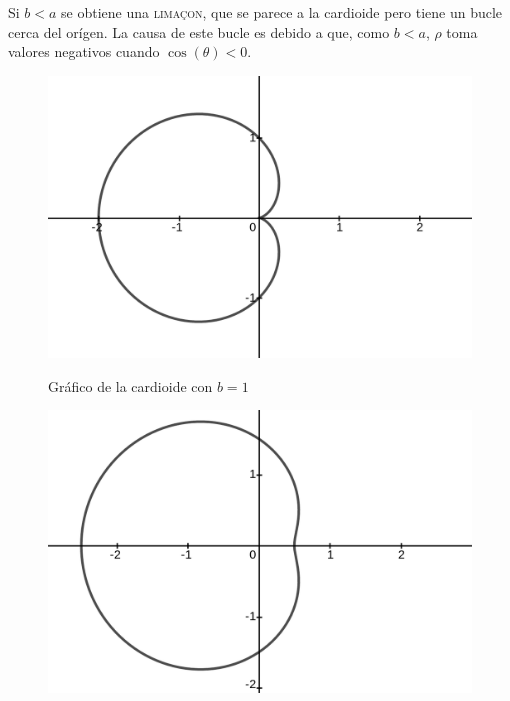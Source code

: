 \documentclass[mid,fleqn,draft,twoside]{notasdeclase}
\begin{document}
\begin{ejem}[cardioides]
	Si $b<a$ se obtiene una \textsc{lima\c con}, que se parece a la cardioide pero tiene un bucle cerca del orígen. La causa de este bucle es debido a que, como $b<a$, $\rho$ toma valores negativos cuando $\cos(\theta)<0$.\\
\begin{minipage}{.32\linewidth}
	\begin{figure}[H]\centering
		\includegraphics[width=1\linewidth]{pics/c1}\\ 
		\caption{Gráfico de la cardioide con $b=1$}\label{ch0g3}
	\end{figure}
\end{minipage}
\begin{minipage}{.32\linewidth}
	\begin{figure}[H]\centering
		\includegraphics[width=1\linewidth]{pics/c2}\\ 

\end{figure}
\end{minipage}
\end{ejem}
\end{document}
